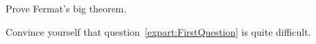 \begin{exenumerate}
\item %
    \label{expart:FirstQuestion}
    Prove Fermat's big theorem.

\item %
    Convince yourself that question~\ref{expart:FirstQuestion} is
    quite difficult.

\end{exenumerate}

